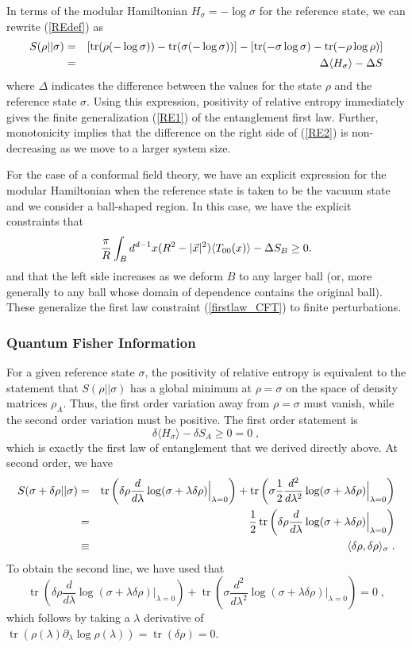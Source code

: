 \documentclass[12pt,epsf]{article}
\newcommand{\be}{\begin{equation}}
\newcommand{\ee}{\end{equation}}
\newcommand{\bea}{\begin{eqnarray}}
\newcommand{\eea}{\end{eqnarray}}
\newcommand{\beas}{\begin{eqnarray*}}
\newcommand{\eeas}{\end{eqnarray*}}
\newcommand{\tr}{\operatorname{tr}}
\begin{document}
In terms of the modular Hamiltonian $H_\sigma = -\log \sigma$ for the reference state, we can rewrite (\ref{REdef}) as
\bea
S(\rho || \sigma) &=&   [\tr(\rho (-\log \sigma)) - \tr(\sigma (-\log \sigma))] - [\tr(-\sigma \log \sigma) -   \tr(-\rho \log \rho)] \cr
&=& \Delta \langle H_\sigma \rangle - \Delta S
\label{RE2}
\eea
where $\Delta$ indicates the difference between the values for the state $\rho$ and the reference state $\sigma$. Using this expression, positivity of relative entropy immediately gives the finite generalization (\ref{RE1}) of the entanglement first law. Further, monotonicity implies that the difference on the right side of (\ref{RE2}) is non-decreasing as we move to a larger system size.

For the case of a conformal field theory, we have an explicit expression for the modular Hamiltonian when the reference state is taken to be the vacuum state and we consider a ball-shaped region. In this case, we have the explicit constraints that
\be
\label{RE_CFT}
{\pi \over R} \int_B d^{d-1} x (R^2 - |\vec{x}|^2) \langle T_{00}(x) \rangle - \Delta S_B \ge 0.
\ee
and that the left side increases as we deform $B$ to any larger ball (or, more generally to any ball  whose domain of dependence contains the original ball). These generalize the first law constraint (\ref{firstlaw_CFT}) to finite perturbations.

\subsubsection*{Quantum Fisher Information}

For a given reference state $\sigma$, the positivity of relative entropy is equivalent to the statement that $S(\rho||\sigma)$ has a global minimum at $\rho = \sigma$ on the space of density matrices $\rho_A$. Thus, the first order variation away from $\rho= \sigma$ must vanish, while the second order variation must be positive. The first order statement is
\be
\label{firstlawA}
\delta \langle H_\sigma \rangle - \delta S_A \ge 0 = 0 \; ,
\ee
which is exactly the first law of entanglement that we derived directly above. At second order, we have
\beas
\label{deffisher}
S(\sigma + \delta \rho||\sigma) &=& \tr \left(\delta \rho \frac{d}{d\lambda}\log(\sigma+\lambda \delta \rho)\Big |_{\lambda=0} \right) + \tr \left( \sigma {1 \over 2} \frac{d^2}{d\lambda^2}\log(\sigma+\lambda \delta \rho)\Big |_{\lambda=0} \right) \cr
&=& \frac{1}{2}\tr \left(\delta \rho \frac{d}{d\lambda}\log(\sigma+\lambda \delta \rho)\Big |_{\lambda=0} \right) \cr
&\equiv& \langle \delta \rho, \delta \rho \rangle_\sigma \; .
\eeas
To obtain the second line, we have used that
\be\label{tracelesseq}
\tr \left(\delta \rho \frac{d}{d\lambda}\log(\sigma+\lambda \delta \rho)\Big |_{\lambda=0} \right) + \tr \left( \sigma \frac{d^2}{d\lambda^2}\log(\sigma+\lambda \delta \rho)\Big |_{\lambda=0} \right)=0 \; ,
\ee
which follows by taking a  $\lambda$ derivative of  $\tr(\rho(\lambda)\partial_\lambda \log\rho(\lambda))=\tr(\delta\rho)=0$.
\end{document}
